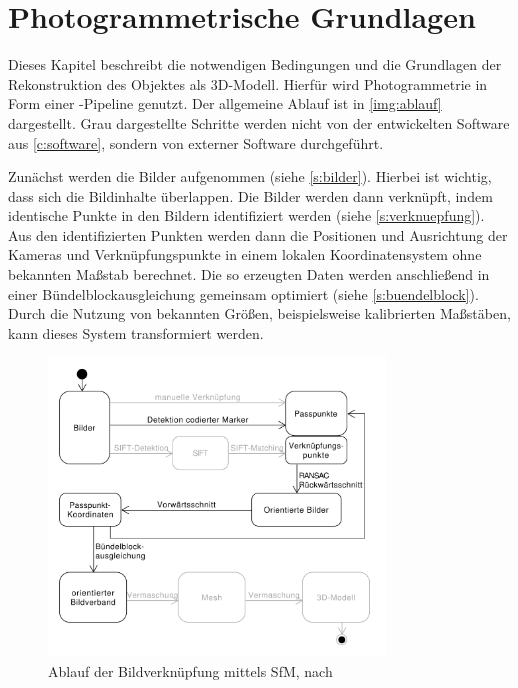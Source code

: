 \documentclass[./00PhotoBox.tex]{subfiles}
\begin{document}
\chapter{Photogrammetrische Grundlagen}
\label{c:photogrammetrie}
Dieses Kapitel beschreibt die notwendigen Bedingungen und die Grundlagen der Rekonstruktion des Objektes als 3D-Modell. Hierfür wird Photogrammetrie in Form einer -Pipeline genutzt. Der allgemeine Ablauf ist in \autoref{img:ablauf} dargestellt. Grau dargestellte Schritte werden nicht von der entwickelten Software aus \autoref{c:software}, sondern von externer Software durchgeführt.

Zunächst werden die Bilder aufgenommen (siehe \autoref{s:bilder}). Hierbei ist wichtig, dass sich die Bildinhalte überlappen. Die Bilder werden dann verknüpft, indem identische Punkte in den Bildern identifiziert werden  (siehe \autoref{s:verknuepfung}).
Aus den identifizierten Punkten werden dann die Positionen und Ausrichtung der Kameras und Verknüpfungspunkte in einem lokalen Koordinatensystem ohne bekannten Maßstab berechnet. Die so erzeugten Daten werden anschließend in einer Bündelblockausgleichung gemeinsam optimiert (siehe \autoref{s:buendelblock}). Durch die Nutzung von bekannten Größen, beispielsweise kalibrierten Maßstäben, kann dieses System transformiert werden.

\begin{figure}
    \centering
    \includegraphics[width=0.8\textwidth]{./img/uml/uml_ablauf.pdf}
    \caption{Ablauf der Bildverknüpfung mittels \acrfull{SfM}, nach \citealt[S. 492]{luhmann}} %
    \label{img:ablauf} %
\end{figure}
\end{document}
